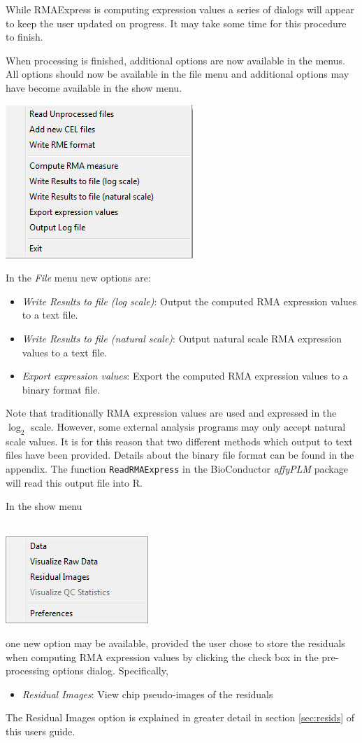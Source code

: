 \documentclass[11pt]{report}
\begin{document}
While RMAExpress is computing expression values a series of dialogs will appear to keep the user updated on progress. It may take some time for this procedure to finish. 

When processing is finished, additional options are now available in the menus. All options should now be available in the file menu and additional options may have become available in the show menu.
\begin{center}
\includegraphics[scale=0.5]{Filemenu3}
\end{center}
In the {\it File} menu new options are:
\begin{itemize}
\item {\it Write Results to file (log scale)}: Output the computed RMA expression values to a text file.
\item {\it Write Results to file (natural scale)}: Output natural scale RMA expression values to a text file.
\item {\it Export expression values}: Export the computed RMA expression values to a binary format file.
\end{itemize}
Note that traditionally RMA expression values are used and expressed in the $\log_2$ scale. However, some external analysis programs may only accept natural scale values. It is for this reason that two different methods which output to text files have been provided. Details about the binary file format can be found in the appendix. The function {\tt ReadRMAExpress} in the BioConductor {\it affyPLM} package will read this output file into R.

In the show menu \\ \\
\begin{center}
\includegraphics[scale=0.5]{showmenu2}
\end{center}
one new option may be available, provided the user chose to store the residuals when computing RMA expression values by clicking the check box in the pre-processing options dialog. Specifically,
\begin{itemize}
\item {\it Residual Images}: View chip pseudo-images of the residuals
\end{itemize}
The Residual Images option is explained in greater detail in section \ref{sec:resids} of this users guide.
\end{document}
